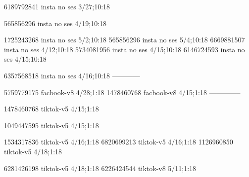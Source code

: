 
6189792841 insta no ses
3/27;10:18

565856296 insta no ses
4/19;10:18

1725243268 insta no ses
5/2;10:18
565856296 insta no ses
5/4;10:18
6669881507 insta no ses
4/12;10:18
5734081956 insta no ses
4/15;10:18
6146724593 insta no ses
4/15;10:18

6357568518 insta no ses
4/16;10:18
------------


5759779175 facbook-v8
4/28;1:18
1478460768 facbook-v8
4/15;1:18
--------------

1478460768 tiktok-v5
4/15;1:18

1049447595 tiktok-v5
4/15;1:18

1534317836 tiktok-v5
4/16;1:18
6820699213 tiktok-v5
4/16;1:18
1126960850 tiktok-v5
4/18;1:18

6281426198 tiktok-v5
4/18;1:18
6226424544 tiktok-v8
5/11;1:18
